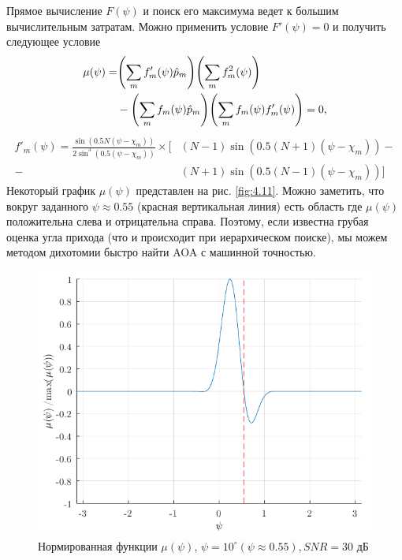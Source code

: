 Прямое вычисление $F(\psi)$ и поиск его максимума ведет к большим вычислительным затратам. Можно применить условие $F'(\psi) =0$ и получить следующее условие
\begin{equation}
    \label{eq:4.31}
    \begin{aligned}
        \mu(\psi) = &
        \qty(\sum\limits_m f'_m(\psi) \hat p_m) \qty(\sum\limits_m f^2_m(\psi))                              \\
                    & - \qty(\sum\limits_m f_m(\psi)\hat p_m) \qty(\sum\limits_m f_m (\psi) f'_m(\psi)) = 0,
    \end{aligned}
\end{equation}
\begin{equation}
    \label{eq:4.32}
    \begin{aligned}
        f'_m(\psi) = \frac{\sin(0.5N (\psi - \chi_m))}{2\sin^3(0.5(\psi - \chi_m))} \times
        \big[
          & (N-1)\sin(0.5(N+1) (\psi - \chi_m)) - \\
        - & (N+1) \sin(0.5(N-1)(\psi - \chi_m))
            \big]
    \end{aligned}
\end{equation}
Некоторый график $\mu(\psi)$ представлен на рис. \ref{fig:4.11}. Можно заметить, что вокруг заданного $\psi \approx 0.55$ (красная вертикальная линия) есть область где
$\mu(\psi)$ положительна слева и отрицательна справа. Поэтому, если известна грубая оценка угла прихода (что и происходит при иерархическом поиске), мы можем методом дихотомии быстро найти AOA с машинной точностью.
\begin{figure}[ht]
    \centering
    \includegraphics[width=0.75\linewidth]{figs/fig4.11}
    \caption{Нормированная функции $\mu(\psi)$, $\psi=10^{\circ} (\psi \approx 0.55), SNR=30$ дБ}
    \label{fig:4.12}
\end{figure}

